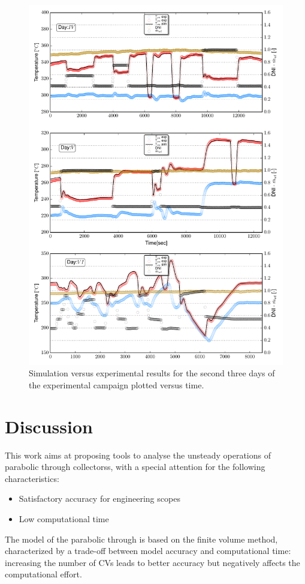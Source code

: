 \documentclass[final,3p,times,review]{elsarticle}
\begin{document}
\begin{figure}[h!]
	\centering
	\includegraphics[width=1\textwidth]{Figures/_SecondThreeDays.pdf}
	\caption{Simulation versus experimental results for  the second three days of the experimental campaign plotted versus time. }
	\label{fig:SF_ModRes_All}
\end{figure}
%
%
\section{Discussion} 
%
This work aims at proposing tools to analyse the unsteady operations of parabolic through collectorss, with a special
attention for the following characteristics:
%
\begin{itemize}
	\item Satisfactory accuracy for engineering scopes
	\item Low computational time
\end{itemize}
%
The model of the parabolic through is based on the finite volume method, characterized by a trade-off between model accuracy and computational time: increasing the number of CVs leads to better accuracy but negatively affects
the computational effort.
\end{document}
